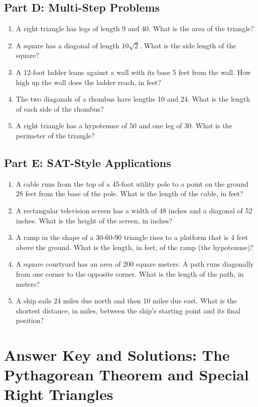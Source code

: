 \documentclass[14pt]{extarticle}
\begin{document}
\subsection*{Part D: Multi-Step Problems}
\begin{enumerate}
  \item A right triangle has legs of length 9 and 40. What is the area of the triangle?
  \item A square has a diagonal of length \(10\sqrt{2}\). What is the side length of the square?
  \item A 12-foot ladder leans against a wall with its base 5 feet from the wall. How high up the wall does the ladder reach, in feet?
  \item The two diagonals of a rhombus have lengths 10 and 24. What is the length of each side of the rhombus?
  \item A right triangle has a hypotenuse of 50 and one leg of 30. What is the perimeter of the triangle?
\end{enumerate}

\subsection*{Part E: SAT-Style Applications}
\begin{enumerate}
  \item A cable runs from the top of a 45-foot utility pole to a point on the ground 28 feet from the base of the pole. What is the length of the cable, in feet?
  \item A rectangular television screen has a width of 48 inches and a diagonal of 52 inches. What is the height of the screen, in inches?
  \item A ramp in the shape of a 30-60-90 triangle rises to a platform that is 4 feet above the ground. What is the length, in feet, of the ramp (the hypotenuse)?
  \item A square courtyard has an area of 200 square meters. A path runs diagonally from one corner to the opposite corner. What is the length of the path, in meters?
  \item A ship sails 24 miles due north and then 10 miles due east. What is the shortest distance, in miles, between the ship's starting point and its final position?
\end{enumerate}

\newpage

\section*{Answer Key and Solutions: The Pythagorean Theorem and Special Right Triangles}
\end{document}
